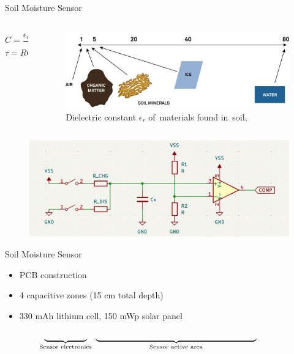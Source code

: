 \documentclass[hyphens]{beamer}
\begin{document}
\begin{frame}{Soil Moisture Sensor}
\centering
\begin{columns}
\begin{column}{.25\textwidth}
    $$C = \dfrac{\epsilon_r \epsilon_0 S}{d}~~\mathrm{[F]}$$
    $$\tau = RC~~\mathrm{[s]}$$
\end{column}
\hfil
\begin{column}{.75\textwidth}
    \begin{figure}
        \includegraphics[width=\linewidth]{../thesis/fig/dielectric-constant.jpg}
        \caption*{Dielectric constant $\epsilon_r$ of~materials found in~soil, \cite{meter_group_soil_2023}}
    \end{figure}
\end{column}
\end{columns}
\begin{figure}
    \includegraphics[width=.9\linewidth]{../thesis/fig/principle-cap-measure.png}
\end{figure}
\end{frame}


\begin{frame}{Soil Moisture Sensor}
\begin{itemize}
    \item PCB construction
    \item 4 capacitive zones (15 cm total depth)
    \item 330 mAh lithium cell, 150 mWp solar panel
\end{itemize}
\begin{figure}
    \centering
    
\end{figure}
$$\underbrace{\text{\hspace{5em}}}_{\text{Sensor electronics}}~\underbrace{\text{\hspace{19em}}}_{\text{Sensor active area}}\text{\hspace{2.5em}}$$
\end{frame}
\end{document}
